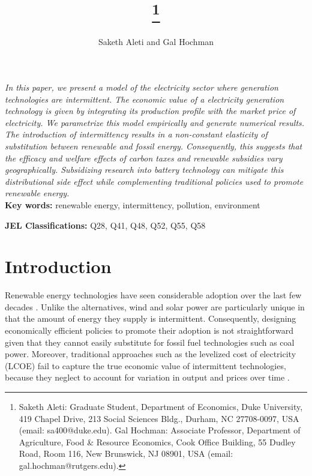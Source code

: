 \documentclass[11pt,a4paper,leqno]{extarticle}
\begin{document}
	
	\title{\thanks{Saketh Aleti: Graduate Student, Department of Economics, Duke University, 419 Chapel Drive, 213 Social Sciences Bldg., Durham, NC 27708-0097, USA (email: sa400@duke.edu). Gal Hochman: Associate Professor, Department of Agriculture, Food \& Resource Economics, Cook Office Building, 55 Dudley Road, Room 116, New Brunswick, NJ 08901, USA (email: gal.hochman@rutgers.edu).}}
	
	\author[]{Saketh Aleti and Gal Hochman}
	
	\date{\vspace{-1em}}
	
	\maketitle
	
	\begin{addmargin}[0.5in]{0.5in}
		\textit{In this paper, we present a model of the electricity sector where generation technologies are intermittent. The economic value of a electricity generation technology is given by integrating its production profile with the market price of electricity. We parametrize this model empirically and generate numerical results. The introduction of intermittency results in a non-constant elasticity of substitution between renewable and fossil energy. Consequently, this suggests that the efficacy and welfare effects of carbon taxes and renewable subsidies vary geographically. Subsidizing research into battery technology can mitigate this distributional side effect while complementing traditional policies used to promote renewable energy. 
		}
		\\
		\noindent\textbf{Key words:} renewable energy, intermittency, pollution, environment
		
		\noindent\textbf{JEL Classifications:} Q28, Q41, Q48, Q52, Q55, Q58
	\end{addmargin}
	
	
	
	\section{Introduction}
	
	Renewable energy technologies have seen considerable adoption over the last few decades \citep{EIArenew}. Unlike the alternatives, wind and solar power are particularly unique in that the amount of energy they supply is intermittent. Consequently, designing economically efficient policies to promote their adoption is not straightforward given that they cannot easily substitute for fossil fuel technologies such as coal power. Moreover, traditional approaches such as the levelized cost of electricity (LCOE) fail to capture the true economic value of intermittent technologies, because they neglect to account for variation in output and prices over time \citep{Joskow2011}.  
	
\end{document}
